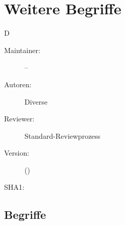 % 
\def\ChapterCode{WEI}
\chapter
[\CO{[WEI]} Weitere Begriffe]
{Weitere Begriffe}
\label{chp:WEI}

\ChapterIntro
{%
D
}
{%
\begin{description}
  \item[Maintainer:] --
  \item[Autoren:] Diverse
  \item[Reviewer:] Standard-Reviewprozess
  \item[Version:] {\DocVersion} ({\DocVersionInfo})
  \item[SHA1:] {\DocGitCommit}
\end{description}

{\TxTeilkapitelAASS}
}



\clearpage %
\section{Begriffe}

\ChapterEnd